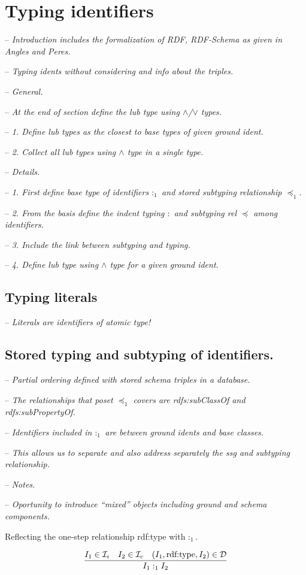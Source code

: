 \documentclass[runningheads]{llncs}
\newcommand{\D}{{\cal D}}
\newcommand{\Ii}{{\cal I}_i}
\newcommand{\Ic}{{\cal I}_c}
\newcommand{\nl}{\hfill\break}
\newcommand{\notes}[1]{\noindent\begin{small}-- \emph{#1}\\\end{small}}
\begin{document}
\section{Typing identifiers}

\notes{Introduction includes the formalization of RDF, RDF-Schema as given in Angles and Peres.}
\notes{Typing idents without considering and info about the triples.}

\notes{General.}
\notes{At the end of section define the lub type using $\land$/$\lor$ types.}
\notes{1. Define lub types as the closest to base types of given ground ident.}
\notes{2. Collect all lub types using $\land$ type in a single type.}

\notes{Details.}
\notes{1. First define base type of identifiers $:_1$ and stored subtyping relationship $\preceq_1$.}
\notes{2. From the basis define the indent typing $:$ and subtyping rel $\preceq$ among identifiers.}
\notes{3. Include the link between subtyping and typing.}
\notes{4. Define lub type using $\land$ type for a given ground ident.}




\subsection{Typing literals}

\notes{Literals are identifiers of atomic type!}





\subsection{Stored typing and subtyping of identifiers.}\nl

\notes{Partial ordering defined with stored schema triples in a database.}
\notes{The relationships that poset $\preceq_1$ covers are rdfs:subClassOf and rdfs:subPropertyOf. }
\notes{Identifiers included in $:_1$ are between ground idents and base classes.}
\notes{This allows us to separate and also address separately the ssg and subtyping relationship.}

\notes{Notes.}
\notes{Oportunity to introduce ``mixed'' objects including ground and schema components.}


\noindent Reflecting the one-step relationship rdf:type with $:_1$. 

\begin{equation}
\dfrac{I_1\in\Ii \quad I_2\in\Ic \quad (I_1,\text{rdf:type},I_2)\in \D}
      {I_1 :_1 I_2}
\end{equation}
\end{document}
